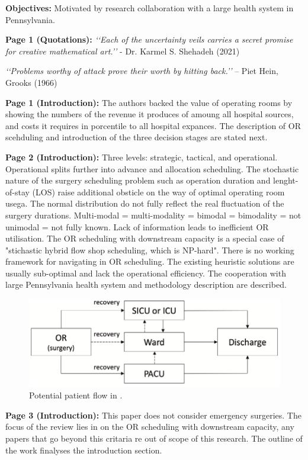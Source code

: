     \textbf{Objectives:}
    Motivated by research collaboration with a large health system in Pennsylvania.
    
    \textbf{Page 1 (Quotations):}
    \textit{‘‘Each of the uncertainty veils carries a secret promise for creative mathematical art.’’} - Dr. Karmel S. Shehadeh (2021)
    
    \textit{‘‘Problems worthy of attack prove their worth by hitting back.’’} – Piet Hein, Grooks (1966)

    \textbf{Page 1 (Introduction):}
    The authors backed the value of operating rooms by showing the numbers of the revenue it produces of amoung all hospital sources, and costs it requires in porcentile to all hospital expances. The description of OR scehduling and introduction of the three decision stages are stated next.
    
    \textbf{Page 2 (Introduction):}
    Three levels: strategic, tactical, and operational. Operational splits further into advance and allocation scheduling. The stochastic nature of the surgery scheduling problem such as operation duration and lenght-of-stay (LOS) raise additional obsticle on the way of optimal operating room usega. The normal distribution do not fully reflect the real fluctuation of the surgery durations. Multi-modal = multi-modality = bimodal = bimodality = not unimodal = not fully known. Lack of information leads to inefficient OR utilisation. The OR scheduling with downstream capacity is a special case of "stichastic hybrid flow shop scheduling, which is NP-hard". There is no working framework for navigating in OR scheduling. The existing heuristic solutions are usually sub-optimal and lack the operational efficiency. The cooperation with large Pennsylvania health system and methodology description are described. 
    \begin{figure}[H]
        \centering
        \includegraphics[width=.7\textwidth]{figures/SR0015US22/fig1.png}
        \caption{Potential patient flow in \cite{x335}.}
        \label{fig1:SR0015US22}
    \end{figure}
    
    \textbf{Page 3 (Introduction):}
    This paper does not consider emergency surgeries. The focus of the review lies in on the OR scheduling with downstream capacity, any papers that go beyond this critaria re out of scope of this research. The outline of the work finalyses the introduction section.

